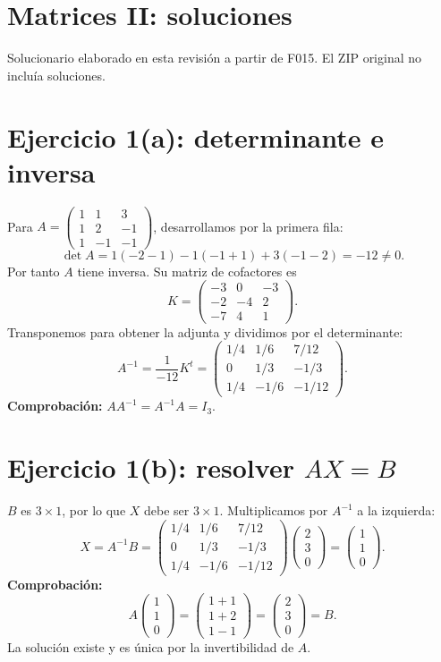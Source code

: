 \documentclass[11pt]{article}
\begin{document}
\section*{Matrices II: soluciones}
Solucionario elaborado en esta revisión a partir de F015. El ZIP original no incluía soluciones.
\section*{Ejercicio 1(a): determinante e inversa}
Para $A=\begin{pmatrix}1&1&3\\1&2&-1\\1&-1&-1\end{pmatrix}$, desarrollamos por la primera fila:
\[
\det A=1(-2-1)-1(-1+1)+3(-1-2)=-12\neq0.
\]
Por tanto $A$ tiene inversa. Su matriz de cofactores es
\[
K=\begin{pmatrix}-3&0&-3\\-2&-4&2\\-7&4&1\end{pmatrix}.
\]
Transponemos para obtener la adjunta y dividimos por el determinante:
\[
A^{-1}=\frac1{-12}K^t
=\boxed{\begin{pmatrix}1/4&1/6&7/12\\0&1/3&-1/3\\1/4&-1/6&-1/12\end{pmatrix}}.
\]
\textbf{Comprobación:} $AA^{-1}=A^{-1}A=I_3$.
\section*{Ejercicio 1(b): resolver $AX=B$}
$B$ es $3\times1$, por lo que $X$ debe ser $3\times1$. Multiplicamos por $A^{-1}$ a la izquierda:
\[
X=A^{-1}B=
\begin{pmatrix}1/4&1/6&7/12\\0&1/3&-1/3\\1/4&-1/6&-1/12\end{pmatrix}
\begin{pmatrix}2\\3\\0\end{pmatrix}
=\boxed{\begin{pmatrix}1\\1\\0\end{pmatrix}}.
\]
\textbf{Comprobación:}
\[
A\begin{pmatrix}1\\1\\0\end{pmatrix}
=\begin{pmatrix}1+1\\1+2\\1-1\end{pmatrix}
=\begin{pmatrix}2\\3\\0\end{pmatrix}=B.
\]
La solución existe y es única por la invertibilidad de $A$.
\clearpage
\end{document}
